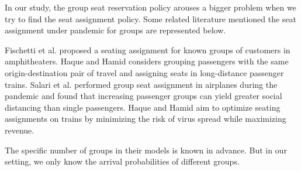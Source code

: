 
In our study, the group seat reservation policy arouses a bigger problem when we try to find the seat assignment policy. Some related literature mentioned the seat assignment under pandemic for groups are represented below.

Fischetti et al. \cite{fischetti2021safe} proposed a seating assignment for known groups of customers in amphitheaters. Haque and Hamid \cite{haque2022optimization} considers grouping passengers with the same origin-destination pair of travel and assigning seats in long-distance passenger trains. Salari et al. \cite{salari2022social} performed group seat assignment in airplanes during the pandemic and found that increasing passenger groups can yield greater social distancing than single passengers. Haque and Hamid \cite{haque2023social} aim to optimize seating assignments on trains by minimizing the risk of virus spread while maximizing revenue. 

The specific number of groups in their models is known in advance. But in our setting, we only know the arrival probabilities of different groups.










